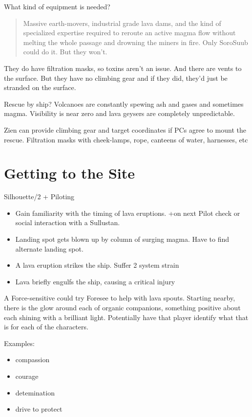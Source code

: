 \documentclass{book}
\newcommand{\stb}{\setback}
\begin{document}
\begin{multicols}{2}
What kind of equipment is needed? \\
\begin{quote}
Massive earth-movers, industrial grade lava dams, and the kind of specialized expertise required to reroute an active magma flow without melting the whole passage and drowning the miners in fire. Only SoroSuub could do it. But they won’t.
\end{quote}

They do have filtration masks, so toxins aren’t an issue. And there are vents to the surface. But they have no climbing gear and if they did, they’d just be stranded on the surface.


Rescue by ship? Volcanoes are constantly spewing ash and gases and sometimes magma. Visibility is near zero and lava geysers are completely unpredictable. 


Zien can provide climbing gear and target coordinates if PCs agree to mount the rescue. Filtration masks with cheek-lamps, rope, canteens of water, harnesses, etc

\section{Getting to the Site}

Silhouette/2 + \stb\stb\stb Piloting

\begin{itemize}
	\item \advantage Gain familiarity with the timing of lava eruptions.  +\boost on next Pilot check or social interaction with a Sullustan.
	\item \failure Landing spot gets blown up by column of surging magma. Have to find alternate landing spot.
	\item \threat \threat A lava eruption strikes the ship.  Suffer 2 system strain
	\item \despair Lava briefly engulfs the ship, causing a critical injury
\end{itemize}

A Force-sensitive could try Foresee to help with lava spouts. Starting nearby, there is the glow around each of organic companions, something positive about each shining with a brilliant light. Potentially have that player identify what that is for each of the characters.

Examples:
\begin{itemize}
    \item compassion
    \item courage
    \item detemination
    \item drive to protect
\end{itemize}


\end{multicols}
\end{document}
